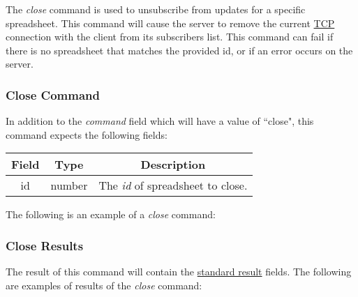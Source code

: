 The \emph{close} command is used to unsubscribe from updates for a specific 
spreadsheet. This command will cause the server to remove the current \href{https://en.wikipedia.org/wiki/Transmission_Control_Protocol}{TCP} 
connection with the client from its subscribers list. This command can fail 
if there is no spreadsheet that matches the provided id, or if an error 
occurs on the server.

\subsubsection{Close Command}
In addition to the \emph{command} field which will have a value of ``close", this command expects the following fields:
\begin{table}[H]
    \begin{center}
        \begin{tabular}{|c|c|c|}\hline
            Field & Type & Description \\\hline
            id & number & The \emph{id} of spreadsheet to close. \\\hline
        \end{tabular}
    \end{center}
\end{table}

The following is an example of a \emph{close} command:


\subsubsection{Close Results}
The result of this command will contain the \hyperref[sec:message:result]{standard result} fields.
The following are examples of results of the \emph{close} command:



